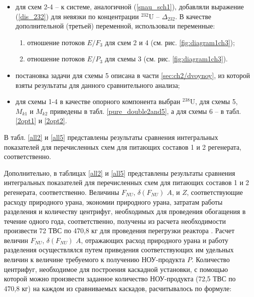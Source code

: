 \begin{itemize}
    \item для схем 2-4 -- к системе, аналогичной (\ref{snau_sch1}), добавляли выражение (\ref{dis_232}) для невязки по концентрации $^{232}$U -- $\Delta_{232}$. В качестве дополнительной (третьей) переменной, использовали переменные:
    \begin{enumerate}
        \item отношение потоков $E/{F_3}$ для схем 2 и 4 (см. рис. \ref{fig:diagram1ch3});
        \item отношение потоков $E/{P_3}$ для схемы 3 (см. рис. \ref{fig:diagram1ch3}).
    \end{enumerate}
    \item постановка задачи для схемы 5 описана в части \ref{sec:ch2/dvoynoy}, из которой взяты результаты для данного сравнительного анализа;
    \item для схемы 1-4 в качестве опорного компонента выбран $^{238}$U, для схемы 5, $M_{k1}$ и $M_{k2}$ приведены в табл. \ref{pure_double2and5}, а для схемы 6 -- в табл. \ref{2opt1} и \ref{2opt2}.
\end{itemize}

В табл. \ref{all2} и \ref{all5} представлены результаты сравнения интегральных показателей для перечисленных схем для питающих составов 1 и 2 регенерата, соответственно.

Дополнительно, в таблицах \ref{all2} и \ref{all5} представлены результаты сравнения интегральных показателей для перечисленных схем для питающих составов 1 и 2 регенерата, соответственно.
Величины $F_{NU}$, $\delta(F_{NU})$ $A$, и $Z$, соответствующие расходу природного урана, экономии природного урана, затратам работы разделения и количеству центрифуг, необходимых для проведения обогащения в течение одного года, соответственно, получены из расчета необходимости произвести 72 ТВС по 470,8 кг для проведения перегрузки реактора \cite{BOBROVPovyshenieTehnikoekonomicheskihHarakteristik2019}. Расчет величин $F_{NU}$, $\delta(F_{NU})$ $A$, отражающих расход природного урана и работу разделения осуществлялся путем приведения соответствующих им удельных величин к величине требуемого к получению НОУ-продукта $P$. Количество центрифуг, необходимое для построения каскадной установки, с помощью которой можно произвести заданное количество НОУ-продукта (72,5 ТВС по 470,8 кг) на каждом из сравниваемых каскадов, расчитывалось по формуле:

